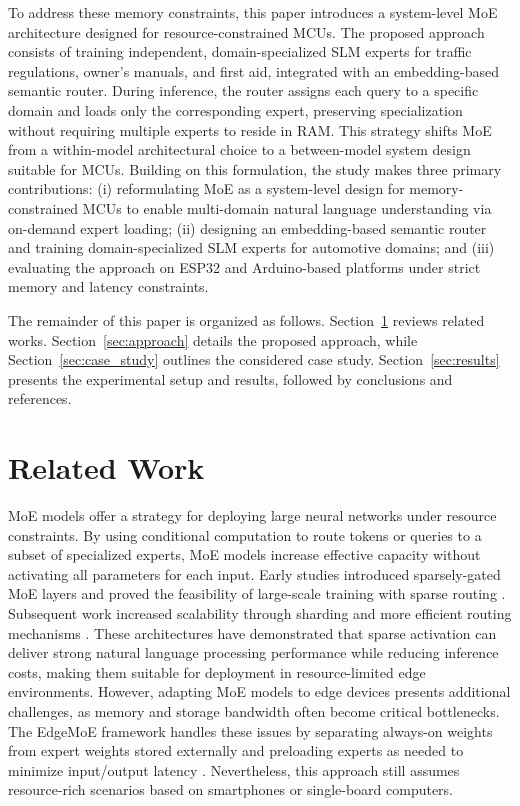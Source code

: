 \documentclass[conference]{IEEEtran}
\begin{document}
To address these memory constraints, this paper introduces a system-level MoE architecture designed for resource-constrained MCUs. The proposed approach consists of training independent, domain-specialized SLM experts for traffic regulations, owner's manuals, and first aid, integrated with an embedding-based semantic router. During inference, the router assigns each query to a specific domain and loads only the corresponding expert, preserving specialization without requiring multiple experts to reside in RAM. This strategy shifts MoE from a within-model architectural choice to a between-model system design suitable for MCUs. Building on this formulation, the study makes three primary contributions: (i) reformulating MoE as a system-level design for memory-constrained MCUs to enable multi-domain natural language understanding via on-demand expert loading; (ii) designing an embedding-based semantic router and training domain-specialized SLM experts for automotive domains; and (iii) evaluating the approach on ESP32 and Arduino-based platforms under strict memory and latency constraints.

The remainder of this paper is organized as follows. Section~\ref{sec:related} reviews related works. Section~\ref{sec:approach} details the proposed approach, while Section~\ref{sec:case_study} outlines the considered case study. Section~\ref{sec:results} presents the experimental setup and results, followed by conclusions and references. 

\section{Related Work} 
\label{sec:related}

MoE models offer a strategy for deploying large neural networks under resource constraints. By using conditional computation to route tokens or queries to a subset of specialized experts, MoE models increase effective capacity without activating all parameters for each input. Early studies introduced sparsely-gated MoE layers and proved the feasibility of large-scale training with sparse routing \cite{shazeerOutrageouslyLargeNeural2017}. Subsequent work increased scalability through sharding and more efficient routing mechanisms \cite{lepikhinGShardScalingGiant2020,fedusSwitchTransformersScaling2021}. These architectures have demonstrated that sparse activation can deliver strong natural language processing performance while reducing inference costs, making them suitable for deployment in resource-limited edge environments. However, adapting MoE models to edge devices presents additional challenges, as memory and storage bandwidth often become critical bottlenecks. The EdgeMoE framework handles these issues by separating always-on weights from expert weights stored externally and preloading experts as needed to minimize input/output latency \cite{yi2025edgemoe}. Nevertheless, this approach still assumes resource-rich scenarios based on smartphones or single-board computers. 
\end{document}
